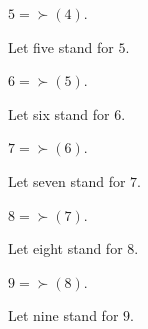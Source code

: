 \documentclass[10pt]{article}
\begin{document}
  \begin{forthel}
    \begin{definition}
      $5 = \succ(4)$.
    \end{definition}

    Let five stand for $5$.
  \end{forthel}

  \begin{forthel}
    \begin{definition}
      $6 = \succ(5)$.
    \end{definition}

    Let six stand for $6$.
  \end{forthel}

  \begin{forthel}
    \begin{definition}
      $7 = \succ(6)$.
    \end{definition}

    Let seven stand for $7$.
  \end{forthel}

  \begin{forthel}
    \begin{definition}
      $8 = \succ(7)$.
    \end{definition}

    Let eight stand for $8$.
  \end{forthel}

  \begin{forthel}
    \begin{definition}
      $9 = \succ(8)$.
    \end{definition}

    Let nine stand for $9$.
  \end{forthel}
\end{document}
